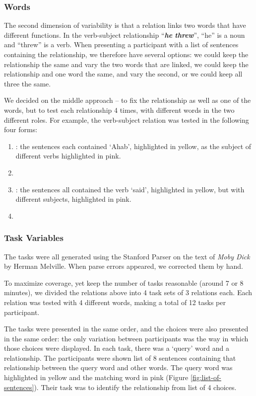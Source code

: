 \subsubsection{Words}
The second dimension of variability is that a relation links two words that have different functions. In the verb-subject relationship ``\emph{\textbf{he} \textbf{threw}}'', ``he'' is a noun and ``threw'' is a verb. When presenting a participant with a list of sentences containing the relationship, we therefore have several options: we could keep the relationship the same and vary the two words that are linked,  we could keep the relationship and one word the same, and vary the second, or we could keep all three the same.

We decided on the middle approach -- to fix the relationship as well as one of the words, but to test each relationship 4 times, with different words in the two different roles. For example, the verb-subject relation  was tested in the following four forms:
\begin{enumerate}
	\item {}:  the sentences each contained `Ahab', highlighted in yellow, as the subject of different verbs highlighted in pink.
	\item {}

	\item {}: the sentences all contained the verb `said', highlighted in yellow, but with different subjects, highlighted in pink.
	\item {}
\end{enumerate}

\subsubsection{Task Variables}

The tasks were all generated using the Stanford Parser on the text of \emph{Moby Dick} by Herman Melville. When parse errors appeared, we corrected them by hand.

To maximize coverage, yet keep the number of tasks reasonable (around 7 or 8 minutes), we divided the relations above into 4 task sets of 3 relations each. Each relation was tested with 4 different words, making a total of 12 tasks per participant.

The tasks were presented in the same order, and the choices were also presented in the same order: the only variation between participants was the way in which those choices were displayed. In each task, there was a `query' word and a relationship. The participants were shown list of 8 sentences containing that relationship between the query word and other words. The query word was highlighted in yellow and the matching word in pink (Figure \ref{fig:list-of-sentences}). Their task was to identify the relationship from list of 4 choices.

